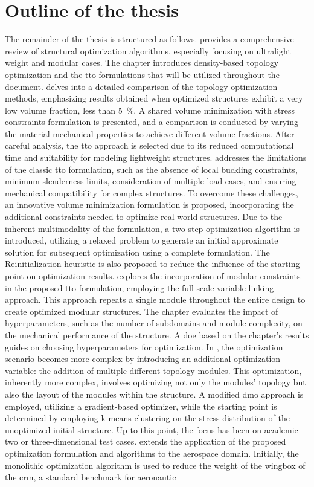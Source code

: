 \section*{Outline of the thesis}
The remainder of the thesis is structured as follows.  provides a comprehensive review of structural optimization algorithms, especially focusing on ultralight weight and modular cases. The chapter introduces density-based topology optimization and the \gls{tto} formulations that will be utilized throughout the document.  delves into a detailed comparison of the topology optimization methods, emphasizing results obtained when optimized structures exhibit a very low volume fraction, \ie less than \qty{5}{\percent}. A shared volume minimization with stress constraints formulation is presented, and a comparison is conducted by varying the material mechanical properties to achieve different volume fractions. After careful analysis, the \gls{tto} approach is selected due to its reduced computational time and suitability for modeling lightweight structures.  addresses the limitations of the classic \gls{tto} formulation, such as the absence of local buckling constraints, minimum slenderness limits, consideration of multiple load cases, and ensuring mechanical compatibility for complex structures. To overcome these challenges, an innovative volume minimization formulation is proposed, incorporating the additional constraints needed to optimize real-world structures. Due to the inherent multimodality of the formulation, a two-step optimization algorithm is introduced, utilizing a relaxed problem to generate an initial approximate solution for subsequent optimization using a complete formulation. The Reinitialization heuristic is also proposed to reduce the influence of the starting point on optimization results.  explores the incorporation of modular constraints in the proposed \gls{tto} formulation, employing the full-scale variable linking approach. This approach repeats a single module throughout the entire design to create optimized modular structures. The chapter evaluates the impact of hyperparameters, such as the number of subdomains and module complexity, on the mechanical performance of the structure. A \gls{doe} based on the chapter's results guides on choosing hyperparameters for optimization. In , the optimization scenario becomes more complex by introducing an additional optimization variable: the addition of multiple different topology modules. This optimization, inherently more complex, involves optimizing not only the modules' topology but also the layout of the modules within the structure. A modified \gls{dmo} approach is employed, utilizing a gradient-based optimizer, while the starting point is determined by employing k-means clustering on the stress distribution of the unoptimized initial structure. Up to this point, the focus has been on academic two or three-dimensional test cases.  extends the application of the proposed optimization formulation and algorithms to the aerospace domain. Initially, the monolithic optimization algorithm is used to reduce the weight of the wingbox of the \gls{crm}, a standard benchmark for aeronautic 